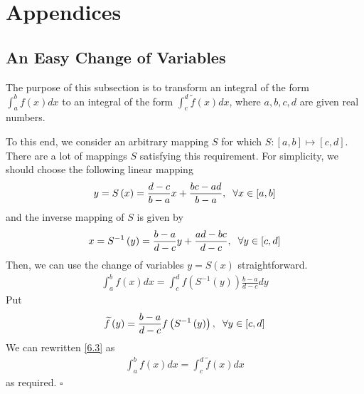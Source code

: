 \documentclass[a4paper]{article}
\numberwithin{equation}{section}
\begin{document}
\section{Appendices}
\subsection{An Easy Change of Variables}
The purpose of this subsection is to transform an integral of the form $\int_a^b {f\left( x \right)dx} $ to an integral of the form $\int_c^d {\widetilde f\left( x \right)dx} $, where $a,b,c,d$ are given real numbers. 

To this end, we consider an arbitrary mapping $S$ for which $S:\left[ {a,b} \right] \mapsto \left[ {c,d} \right]$. There are a lot of mappings $S$ satisfying this requirement. For simplicity, we should choose the following linear mapping
\begin{align}
y=S\left( x \right) = \frac{{d - c}}{{b - a}}x + \frac{{bc - ad}}{{b - a}},\hspace{0.2cm}\forall x \in \left[ {a,b} \right]
\end{align}
and the inverse mapping of $S$ is given by
\begin{align}
x = {S^{ - 1}}\left( y \right) = \frac{{b - a}}{{d - c}}y + \frac{{ad - bc}}{{d - c}},\hspace{0.2cm}\forall y \in \left[ {c,d} \right]
\end{align}
Then, we can use the change of variables $y=S\left(x\right)$ straightforward. 
\begin{align}
\label{6.3}
\int_a^b {f\left( x \right)dx}  = \int_c^d {f\left( {{S^{ - 1}}\left( y \right)} \right)\frac{{b - a}}{{d - c}}dy} 
\end{align}
Put 
\begin{align}
\widetilde f\left( y \right) = \frac{{b - a}}{{d - c}}f\left( {{S^{ - 1}}\left( y \right)} \right),\hspace{0.2cm}\forall y \in \left[ {c,d} \right]
\end{align}
We can rewritten \eqref{6.3} as
\begin{align}
\int_a^b {f\left( x \right)dx}  = \int_c^d {\widetilde f\left( x \right)dx} 
\end{align}
as required. \hfill $\square$
\end{document}
